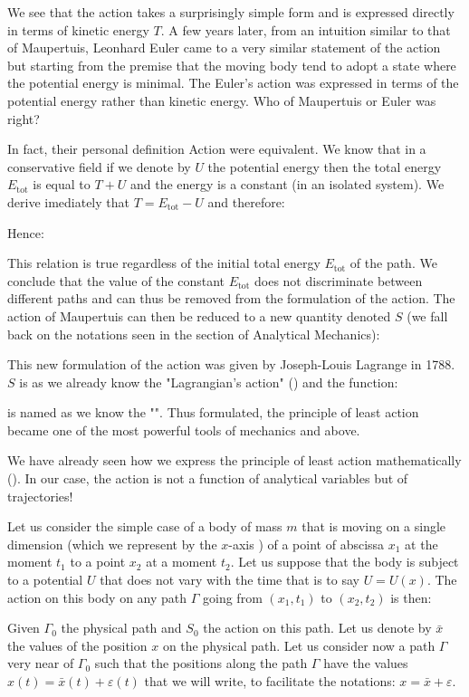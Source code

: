 	We see that the action takes a surprisingly simple form and is expressed directly in terms of kinetic energy $T$. A few years later, from an intuition similar to that of Maupertuis, Leonhard Euler came to a very similar statement of the action but starting from the premise that the moving body tend to adopt a state where the potential energy is minimal. The Euler's action was expressed in terms of the potential energy rather than kinetic energy. Who of Maupertuis or Euler was right?
	
	In fact, their personal definition Action were equivalent. We know that in a conservative field if we denote by $U$ the potential energy then the total energy $E_\text{tot}$ is equal to $T + U$ and the energy is a constant (in an isolated system). We derive imediately that $T = E_\text{tot} - U$ and therefore:
	
	Hence:
	
	This relation is true regardless of the initial total energy $E_\text{tot}$ of the path. We conclude that the value of the constant $E_\text{tot}$ does not discriminate between different paths and can thus be removed from the formulation of the action. The action of Maupertuis can then be reduced to a new quantity denoted $S$ (we fall back on the notations seen in the section of Analytical Mechanics):
	
	This new formulation of the action was given by Joseph-Louis Lagrange in 1788. $S$ is as we already know the "Lagrangian's action" () and the function:
	
	is named as we know the "". Thus formulated, the principle of least action became one of the most powerful tools of mechanics and above.

	We have already seen how we express the principle of least action mathematically (). In our case, the action is not a function of analytical variables but of trajectories!
	
	Let us consider the simple case of a body of mass $m$ that is moving on a single dimension (which we represent by the $x$-axis ) of a point of abscissa $x_1$ at the moment $t_1$ to a point $x_2$ at a moment $t_2$. Let us suppose that the body is subject to a potential $U$ that does not vary with the time that is to say $U=U(x)$. The action on this body on any path $\Gamma$ going from $(x_1,t_1)$ to $(x_2,t_2)$ is then:
	
	Given $\Gamma_0$ the physical path and $S_0$ the action on this path. Let us denote by $\bar{x}$ the values of the position $x$ on the physical path. Let us consider now a path $\Gamma$ very near of $\Gamma_0$ such that the positions along the path $\Gamma$ have the values $x(t)=\bar{x}(t)+\varepsilon(t)$ that we will write, to facilitate the notations: $x=\bar{x}+\varepsilon$.
	
